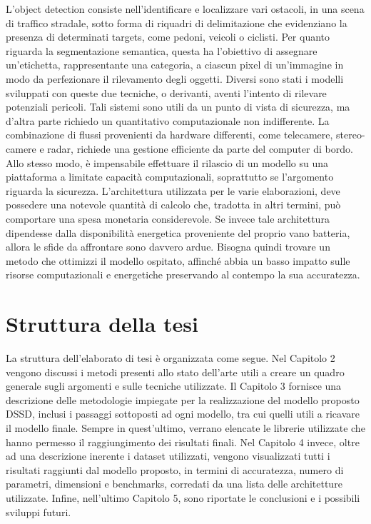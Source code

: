 L'object detection consiste nell'identificare e localizzare vari ostacoli, in una scena di traffico stradale, sotto forma di riquadri di delimitazione che evidenziano la presenza di determinati targets, come pedoni, veicoli o ciclisti. Per quanto riguarda la segmentazione semantica, questa ha l'obiettivo di assegnare un'etichetta, rappresentante una categoria, a ciascun pixel di un'immagine in modo da perfezionare il rilevamento degli oggetti. Diversi sono stati i modelli sviluppati con queste due tecniche, o derivanti, aventi l'intento di rilevare potenziali pericoli. Tali sistemi sono utili da un punto di vista di sicurezza, ma d'altra parte richiedo un quantitativo computazionale non indifferente. La combinazione di flussi provenienti da hardware differenti, come telecamere, stereo-camere e radar, richiede una gestione efficiente da parte del computer di bordo. Allo stesso modo, è impensabile effettuare il rilascio di un modello su una piattaforma a limitate capacità computazionali, soprattutto se l'argomento riguarda la sicurezza. L'architettura utilizzata per le varie elaborazioni, deve possedere una notevole quantità di calcolo che, tradotta in altri termini, può comportare una spesa monetaria considerevole. Se invece tale architettura dipendesse dalla disponibilità energetica proveniente del proprio vano batteria, allora le sfide da affrontare sono davvero ardue. Bisogna quindi trovare un metodo che ottimizzi il modello ospitato, affinché abbia un basso impatto sulle risorse computazionali e energetiche preservando al contempo la sua accuratezza.

\section{Struttura della tesi}
La struttura dell'elaborato di tesi è organizzata come segue. Nel Capitolo 2 vengono discussi i metodi presenti allo stato dell'arte utili a creare un quadro generale sugli argomenti e sulle tecniche utilizzate. Il Capitolo 3 fornisce una descrizione delle metodologie impiegate per la realizzazione del modello proposto DSSD, inclusi i passaggi sottoposti ad ogni modello, tra cui quelli utili a ricavare il modello finale. Sempre in quest'ultimo, verrano elencate le librerie utilizzate che hanno permesso il raggiungimento dei risultati finali. Nel Capitolo 4 invece, oltre ad una descrizione inerente i dataset utilizzati, vengono visualizzati tutti i risultati raggiunti dal modello proposto, in termini di accuratezza, numero di parametri, dimensioni e benchmarks, corredati da una lista delle architetture utilizzate. Infine, nell'ultimo Capitolo 5, sono riportate le conclusioni e i possibili sviluppi futuri. 